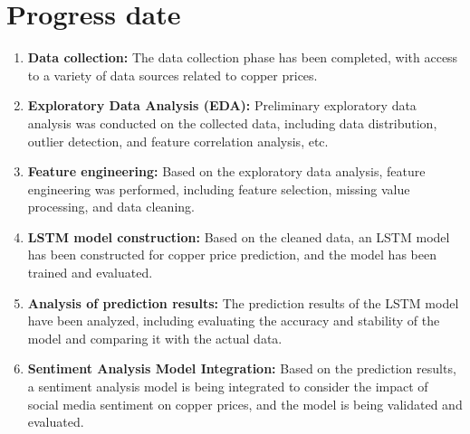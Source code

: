 \documentclass[project-plan]{report-template}
\begin{document}
\section{Progress date}
\begin{enumerate}
    \item \textbf{Data collection:} The data collection phase has been completed, with access to a variety of data sources related to copper prices.
    
    \item \textbf{Exploratory Data Analysis (EDA):} Preliminary exploratory data analysis was conducted on the collected data, including data distribution, outlier detection, and feature correlation analysis, etc.
    
    \item \textbf{Feature engineering:} Based on the exploratory data analysis, feature engineering was performed, including feature selection, missing value processing, and data cleaning.
    
    \item \textbf{LSTM model construction:} Based on the cleaned data, an LSTM model has been constructed for copper price prediction, and the model has been trained and evaluated.
    
    \item \textbf{Analysis of prediction results:} The prediction results of the LSTM model have been analyzed, including evaluating the accuracy and stability of the model and comparing it with the actual data.
    
    \item \textbf{Sentiment Analysis Model Integration:} Based on the prediction results, a sentiment analysis model is being integrated to consider the impact of social media sentiment on copper prices, and the model is being validated and evaluated.
\end{enumerate}
\end{document}
